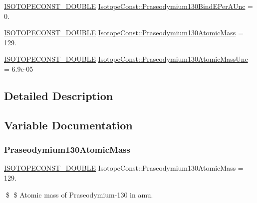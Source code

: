 \begin{DoxyCompactItemize}
\item 
\mbox{\hyperlink{group___isotope_const-_macros_ga8f45a7272ce02c0b4c65c44636ed719a}{I\+S\+O\+T\+O\+P\+E\+C\+O\+N\+S\+T\+\_\+\+D\+O\+U\+B\+LE}} \mbox{\hyperlink{group___isotope_const-_praseodymium-_pr130_ga38a71445af66cfab2474daf3984a8bfd}{Isotope\+Const\+::\+Praseodymium130\+Bind\+E\+Per\+A\+Unc}} = 0.
\item 
\mbox{\hyperlink{group___isotope_const-_macros_ga8f45a7272ce02c0b4c65c44636ed719a}{I\+S\+O\+T\+O\+P\+E\+C\+O\+N\+S\+T\+\_\+\+D\+O\+U\+B\+LE}} \mbox{\hyperlink{group___isotope_const-_praseodymium-_pr130_gaa19618f8763e145475daeb4daacb5576}{Isotope\+Const\+::\+Praseodymium130\+Atomic\+Mass}} = 129.
\item 
\mbox{\hyperlink{group___isotope_const-_macros_ga8f45a7272ce02c0b4c65c44636ed719a}{I\+S\+O\+T\+O\+P\+E\+C\+O\+N\+S\+T\+\_\+\+D\+O\+U\+B\+LE}} \mbox{\hyperlink{group___isotope_const-_praseodymium-_pr130_ga620700413adacf3e91aa8b52e8528da8}{Isotope\+Const\+::\+Praseodymium130\+Atomic\+Mass\+Unc}} = 6.\+9e-\/05
\end{DoxyCompactItemize}


\subsection{Detailed Description}


\subsection{Variable Documentation}
\mbox{\label{group___isotope_const-_praseodymium-_pr130_gaa19618f8763e145475daeb4daacb5576}} 
\subsubsection{\texorpdfstring{Praseodymium130\+Atomic\+Mass}{Praseodymium130AtomicMass}}
{\footnotesize\ttfamily \mbox{\hyperlink{group___isotope_const-_macros_ga8f45a7272ce02c0b4c65c44636ed719a}{I\+S\+O\+T\+O\+P\+E\+C\+O\+N\+S\+T\+\_\+\+D\+O\+U\+B\+LE}} Isotope\+Const\+::\+Praseodymium130\+Atomic\+Mass = 129.}

\$ \$ Atomic mass of Praseodymium-\/130 in amu. \mbox{\label{group___isotope_const-_praseodymium-_pr130_ga620700413adacf3e91aa8b52e8528da8}} 
